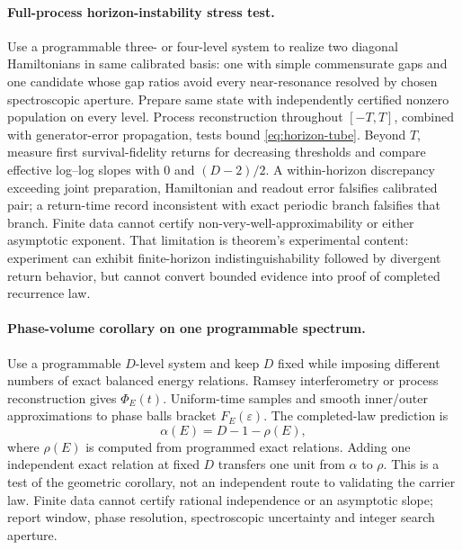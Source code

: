 \paragraph{Full-process horizon-instability stress test.}
Use a programmable three- or four-level system to realize two diagonal
Hamiltonians in same calibrated basis: one with simple commensurate gaps and
one candidate whose gap ratios avoid every near-resonance resolved by chosen
spectroscopic aperture.  Prepare same state with independently certified
nonzero population on every level.  Process reconstruction throughout
$[-T,T]$, combined with generator-error propagation, tests bound
\eqref{eq:horizon-tube}.  Beyond $T$, measure first survival-fidelity returns
for decreasing thresholds and compare effective log--log slopes with $0$ and
$(D-2)/2$.  A within-horizon discrepancy exceeding joint preparation,
Hamiltonian and readout error falsifies calibrated pair; a return-time record
inconsistent with exact periodic branch falsifies that branch.  Finite data
cannot certify non-very-well-approximability or either asymptotic exponent.
That limitation is theorem's experimental content: experiment can exhibit
finite-horizon indistinguishability followed by divergent return behavior,
but cannot convert bounded evidence into proof of completed recurrence law.

\paragraph{Phase-volume corollary on one programmable spectrum.}
Use a programmable $D$-level system and keep $D$ fixed while imposing
different numbers of exact balanced energy relations.  Ramsey interferometry
or process reconstruction gives $\Phi_E(t)$.  Uniform-time samples and smooth
inner/outer approximations to phase balls bracket $F_E(\varepsilon)$.  The
completed-law prediction is
\begin{equation}
 \alpha(E)=D-1-\rho(E),                              \label{eq:experiment-capstone}
\end{equation}
where $\rho(E)$ is computed from programmed exact relations.  Adding one
independent exact relation at fixed $D$ transfers one unit from $\alpha$ to
$\rho$.  This is a test of the geometric corollary, not an independent route
to validating the carrier law.  Finite data cannot certify rational
independence or an asymptotic slope; report window, phase resolution,
spectroscopic uncertainty and integer search aperture.

